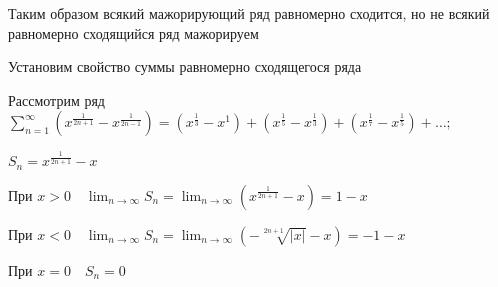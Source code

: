 \documentclass[12pt]{article}
\begin{document}
    \Nota Таким образом всякий мажорирующий ряд равномерно сходится, но не всякий равномерно сходящийся ряд мажорируем

    \Nota Установим свойство суммы равномерно сходящегося ряда

    \Exs Рассмотрим ряд $\sum_{n = 1}^\infty (x^{\frac{1}{2n + 1}} - x^{\frac{1}{2n - 1}}) = (x^\frac{1}{3} - x^1) + (x^\frac{1}{5} - x^\frac{1}{3}) + (x^\frac{1}{7} - x^\frac{1}{5}) + \dots;$

    $S_n = x^\frac{1}{2n + 1} - x$

    При $x > 0 \quad \lim_{n \to \infty} S_n = \lim_{n \to \infty} (x^\frac{1}{2n + 1} - x) = 1 - x$

    При $x < 0 \quad \lim_{n \to \infty} S_n = \lim_{n \to \infty} (-\sqrt[2n + 1]{|x|} - x) = -1 - x$

    При $x = 0 \quad S_n = 0$
\end{document}
